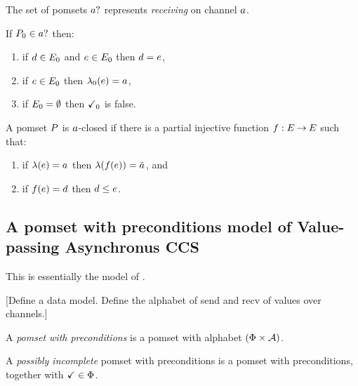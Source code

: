 The set of pomsets $\sRECV\aChan{}$ represents \emph{receiving} on channel $a$.
\begin{definition}
  If $\aPS_0 \in \sRECV\aChan{}$ then:
  \begin{enumerate}
  \item if $d\in E_0$ and $e\in E_0$ then $d=e$,
  \item if $e\in E_0$ then $\lambda_0(e) = {a}_{}$,
  \item if $E_0=\emptyset$ then $\checkmark_0$ is false.
  \end{enumerate}
\end{definition}

\begin{definition}
  A pomset $P$ is $a$-closed if
  there is a partial injective function $f: E \mathbin\rightarrow E$
  such that:
  \begin{enumerate}
  \item if $\lambda(e)={a}_{}$ then $\lambda(f(e))=\bar{a}_{}$, and
  \item if $f(e)=d$ then $d\le e$.
  \end{enumerate}
\end{definition}

\subsection{A pomset with preconditions model of Value-passing Asynchronus CCS}

This is essentially the model of \cite{10.1145/3428262}.

[Define a data model. Define the alphabet of send and recv of values over channels.]

\begin{definition}
  A \emph{pomset with preconditions} is
  a pomset with alphabet $(\Phi \times \mathcal{A})$.
\end{definition}

\begin{definition}
  A \emph{possibly incomplete} pomset with preconditions is a
  pomset with preconditions, together with $\checkmark\in\Phi$.
\end{definition}

